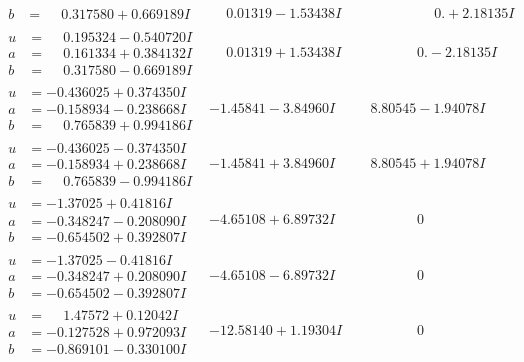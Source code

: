 \documentclass[1p]{elsarticle_modified}
\theoremstyle{definition}
\begin{document}
$$\begin{array}{c|c|c}
\begin{aligned}
b &= \phantom{-}0.317580 + 0.669189 I\end{aligned}
 & \phantom{-}0.01319 - 1.53438 I & \phantom{-0.000000 -}0. + 2.18135 I \\ \hline\begin{aligned}
u &= \phantom{-}0.195324 - 0.540720 I \\
a &= \phantom{-}0.161334 + 0.384132 I \\
b &= \phantom{-}0.317580 - 0.669189 I\end{aligned}
 & \phantom{-}0.01319 + 1.53438 I & \phantom{-0.000000 } 0. - 2.18135 I \\ \hline\begin{aligned}
u &= -0.436025 + 0.374350 I \\
a &= -0.158934 - 0.238668 I \\
b &= \phantom{-}0.765839 + 0.994186 I\end{aligned}
 & -1.45841 - 3.84960 I & \phantom{-}8.80545 - 1.94078 I \\ \hline\begin{aligned}
u &= -0.436025 - 0.374350 I \\
a &= -0.158934 + 0.238668 I \\
b &= \phantom{-}0.765839 - 0.994186 I\end{aligned}
 & -1.45841 + 3.84960 I & \phantom{-}8.80545 + 1.94078 I \\ \hline\begin{aligned}
u &= -1.37025 + 0.41816 I \\
a &= -0.348247 - 0.208090 I \\
b &= -0.654502 + 0.392807 I\end{aligned}
 & -4.65108 + 6.89732 I & \phantom{-0.000000 } 0 \\ \hline\begin{aligned}
u &= -1.37025 - 0.41816 I \\
a &= -0.348247 + 0.208090 I \\
b &= -0.654502 - 0.392807 I\end{aligned}
 & -4.65108 - 6.89732 I & \phantom{-0.000000 } 0 \\ \hline\begin{aligned}
u &= \phantom{-}1.47572 + 0.12042 I \\
a &= -0.127528 + 0.972093 I \\
b &= -0.869101 - 0.330100 I\end{aligned}
 & -12.58140 + 1.19304 I & \phantom{-0.000000 } 0 \\ \hline\begin{aligned}

\end{aligned}
\end{array}$$
\end{document}
